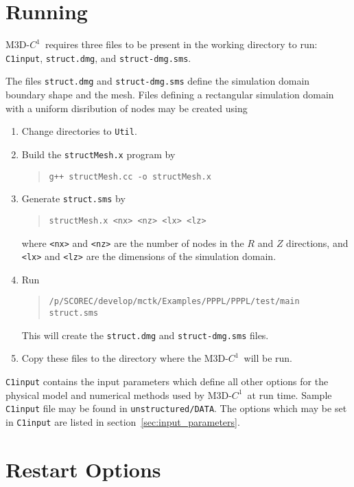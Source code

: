 \documentclass[letterpaper]{book}
\newcommand{\codename}{M3D-$C^1$}
\begin{document}
\section{Running}

\codename\ requires three files to be present in the working directory
to run: \texttt{C1input}, \texttt{struct.dmg}, and
\texttt{struct-dmg.sms}.

The files \texttt{struct.dmg} and \texttt{struct-dmg.sms} define the
simulation domain boundary shape and the mesh.  Files defining a
rectangular simulation domain with a uniform disribution of nodes may
be created using
\begin{enumerate}
\item Change directories to \texttt{Util}.
\item Build the \texttt{structMesh.x} program by 
  \begin{quote}
    \texttt{g++ structMesh.cc -o structMesh.x}
  \end{quote}
\item Generate \texttt{struct.sms} by
  \begin{quote}
    \texttt{structMesh.x <nx> <nz> <lx> <lz>}
  \end{quote}
  where \texttt{<nx>} and \texttt{<nz>} are the number of nodes in the
  $R$ and $Z$ directions, and \texttt{<lx>} and \texttt{<lz>} are the
  dimensions of the simulation domain.
\item Run 
  \begin{quote}
    \texttt{/p/SCOREC/develop/mctk/Examples/PPPL/PPPL/test/main
  struct.sms}
  \end{quote} 
  This will create the \texttt{struct.dmg} and \texttt{struct-dmg.sms}
  files.
\item Copy these files to the directory where the \codename\ will be
  run.
\end{enumerate}

\texttt{C1input} contains the input parameters which define all other
options for the physical model and numerical methods used by
\codename\ at run time.  Sample \texttt{C1input} file may be found in
\texttt{unstructured/DATA}.  The options which may be set in
\texttt{C1input} are listed in section~\ref{sec:input_parameters}.


\section{Restart Options}
\end{document}
